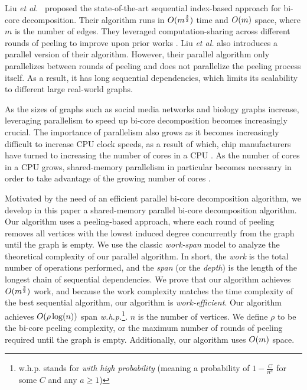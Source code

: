 Liu \textit{et al.}~\cite{Liu2020Efficient} proposed the state-of-the-art sequential index-based approach for bi-core decomposition. Their algorithm runs in $O(m^\frac{3}{2})$ time and $O(m)$ space, where $m$ is the number of edges. They leveraged computation-sharing across different rounds of peeling to improve upon prior works \cite{MonVla15,Liu2020Efficient}. Liu \textit{et al.} also introduces a parallel version of their algorithm. However, their parallel algorithm only parallelizes between rounds of peeling and does not parallelize the peeling process itself. As a result, it has long sequential dependencies, which limits its scalability to different large real-world graphs. 

As the sizes of graphs such as social media networks and biology graphs increase, leveraging parallelism to speed up bi-core decomposition becomes increasingly crucial. The importance of parallelism also grows as it becomes increasingly difficult to increase CPU clock speeds, as a result of which, chip manufacturers have turned to increasing the number of cores in a CPU \cite{SunAgostini19}. As the number of cores in a CPU grows, shared-memory parallelism in particular becomes necessary in order to take advantage of the growing number of cores \cite{Venu11}.

Motivated by the need of an efficient parallel bi-core decomposition algorithm, we develop in this paper a shared-memory parallel bi-core decomposition algorithm. Our algorithm uses a peeling-based approach, where each round of peeling removes all vertices with the lowest induced degree concurrently from the graph until the graph is empty. We use the classic \emph{work-span} model to analyze the theoretical complexity of our parallel algorithm. In short, the \emph{work} is the total number of operations performed, and the \emph{span} (or the \emph{depth}) is the length of the longest chain of sequential dependencies.
We prove that our algorithm achieves $O(m^{\frac{3}{2}})$ work, and because the work complexity matches the time complexity of the best sequential algorithm, our algorithm is \emph{work-efficient}. Our algorithm achieves $O(\rho \log(n))$ span \textit{w.h.p.}\footnote{w.h.p. stands for \emph{with high probability} (meaning a probability of $1-\frac{C}{n^a}$ for some $C$ and any $a\ge 1$) }. $n$ is the number of vertices. We define $\rho$ to be the bi-core peeling complexity, or the maximum number of rounds of peeling required until the graph is empty. Additionally, our algorithm uses $O(m)$ space. 

